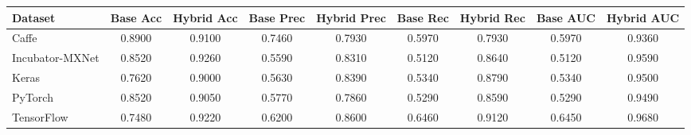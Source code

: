 \begin{tabular}{lcccccccc}
\toprule
Dataset & Base Acc & Hybrid Acc & Base Prec & Hybrid Prec & Base Rec & Hybrid Rec & Base AUC & Hybrid AUC \\
\midrule
Caffe & 0.8900 & 0.9100 & 0.7460 & 0.7930 & 0.5970 & 0.7930 & 0.5970 & 0.9360 \\
Incubator-MXNet & 0.8520 & 0.9260 & 0.5590 & 0.8310 & 0.5120 & 0.8640 & 0.5120 & 0.9590 \\
Keras & 0.7620 & 0.9000 & 0.5630 & 0.8390 & 0.5340 & 0.8790 & 0.5340 & 0.9500 \\
PyTorch & 0.8520 & 0.9050 & 0.5770 & 0.7860 & 0.5290 & 0.8590 & 0.5290 & 0.9490 \\
TensorFlow & 0.7480 & 0.9220 & 0.6200 & 0.8600 & 0.6460 & 0.9120 & 0.6450 & 0.9680 \\
\bottomrule
\end{tabular}